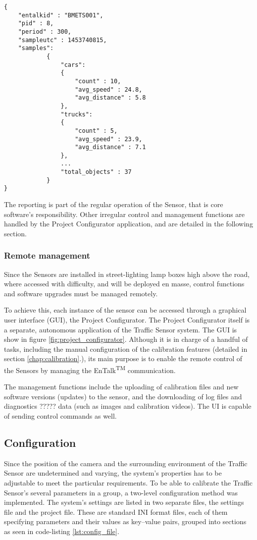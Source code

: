 \begin{lstlisting}[frame=single,float=!ht,caption={Part of a report file. The result of the counting is sent as a JSON syntax file, including the number of vehicles detected in each category.},label=lst:report_file]
{
	"entalkid" : "BMETS001",
	"pid" : 8,
	"period" : 300,
	"sampleutc" : 1453740815,
	"samples":
			{
				"cars":
				{
					"count" : 10,
					"avg_speed" : 24.8,
					"avg_distance" : 5.8
				},
				"trucks":
				{
					"count" : 5,
					"avg_speed" : 23.9,
					"avg_distance" : 7.1
				},
				...
				"total_objects" : 37
			}
}
\end{lstlisting}

The reporting is part of the regular operation of the Sensor, that is core software's responsibility.
Other irregular control and management functions are handled by the Project Configurator application, and are detailed in the following section.

\subsubsection{Remote management}
Since the Sensors are installed in street-lighting lamp boxes high above the road, where accessed with difficulty, and will be deployed en masse, control functions and software upgrades must be managed remotely.

To achieve this, each instance of the sensor can be accessed through a graphical user interface (GUI), the Project Configurator.
The Project Configurator itself is a separate, autonomous application of the Traffic Sensor system.
The GUI is show in figure \ref{fig:project_configurator}.
Although it is in charge of a handful of tasks, including the manual configuration of the calibration features (detailed in section \ref{chap:calibration}.), its main purpose is to enable the remote control of the Sensors by managing the EnTalk\textsuperscript{TM} communication.

The management functions include the uploading of calibration files and new software versions (updates) to the sensor, and the downloading of log files and diagnostics ????? data (such as images and calibration videos).
The UI is capable of sending control commands as well.
\subsection{Configuration}\label{subs:ProjectConfigurator}
Since the position of the camera and the surrounding environment of the Traffic Sensor are undetermined and varying, the system's properties has to be adjustable to meet the particular requirements.
To be able to calibrate the Traffic Sensor's several parameters in a group, a two-level configuration method was implemented.
The system's settings are listed in two separate files, the settings file and the project file.
These are standard INI format files, each of them specifying parameters and their values as key--value pairs, grouped into sections as seen in code-listing \ref{lst:config_file}.

